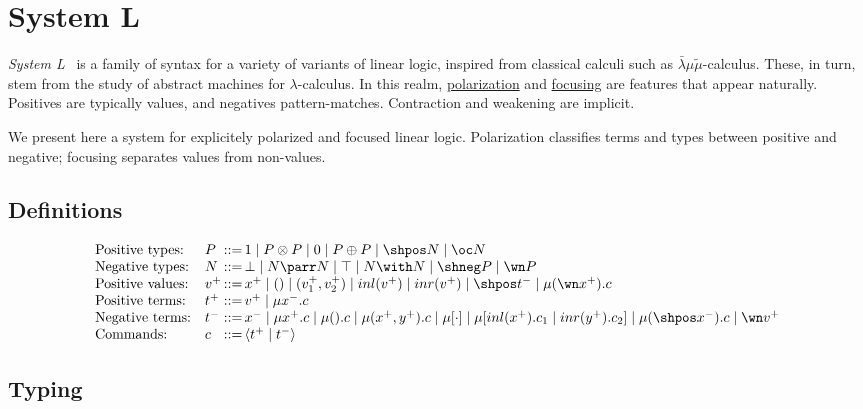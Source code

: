 \chapter{System L}\label{system-l}

\emph{System L}~\cite{dualitycomputationfocus} is a family of syntax for a variety of variants of
linear logic, inspired from classical calculi such as
\(\bar\lambda\mu\tilde\mu\)-calculus. These, in turn, stem from the
study of abstract machines for \(\lambda\)-calculus. In this realm,
\hyperref[polarized-linear-logic]{polarization} and \hyperref[reversibility-and-focusing]{focusing} are
features that appear naturally. Positives are typically values, and
negatives pattern-matches. Contraction and weakening are implicit.

We present here a system for explicitely polarized and focused linear
logic. Polarization classifies terms and types between positive and
negative; focusing separates values from non-values.

\section{Definitions}\label{definitions}

\begin{equation*}
\begin{array}{ll@{\,}l@{\,}l}
\text{Positive types:} & P & ::= & 1 \mid P \otimes P \mid 0 \mid P \oplus P \mid \shpos N \mid \oc N \\
\text{Negative types:} & N & ::= & \bot \mid N \parr N \mid \top \mid N \with N \mid \shneg P \mid \wn P \\
\text{Positive values:} & v^+ & ::= & x^+ \mid () \mid (v_1^+, v_2^+) \mid inl(v^+) \mid inr(v^+) \mid \shpos t^- \mid \mu(\wn x^+).c \\
\text{Positive terms:} & t^+ & ::= & v^+ \mid \mu x^-.c \\
\text{Negative terms:} & t^- & ::= & x^- \mid \mu x^+.c \mid \mu().c \mid \mu(x^+, y^+).c \mid \mu [\cdot] \mid \mu[inl(x^+).c_1 \mid inr(y^+).c_2] \mid \mu(\shpos x^-).c \mid \wn v^+ \\
\text{Commands:} & c & ::= & \langle t^+ \mid t^- \rangle
\end{array}
\end{equation*}

\section{Typing}

